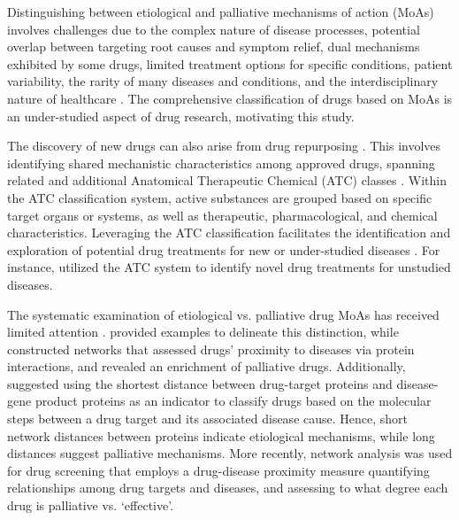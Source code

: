 \documentclass[journal,twoside,web]{ieeecolor}
\begin{document}
Distinguishing between etiological and palliative mechanisms of action (MoAs) involves challenges due to the complex nature of disease processes, potential overlap between targeting root causes and symptom relief, dual mechanisms exhibited by some drugs, limited treatment options for specific conditions, patient variability, the rarity of many diseases and conditions, and the interdisciplinary nature of healthcare \cite{yu2020exploring}.
The comprehensive classification of drugs based on MoAs is an under-studied aspect of drug research, motivating this study.

The discovery of new drugs can also arise from drug repurposing \cite{parvathaneni2019drug}.
This involves identifying shared mechanistic characteristics among approved drugs, spanning related and additional Anatomical Therapeutic Chemical (ATC) classes \cite{xue2018review}.
Within the ATC classification system, active substances are grouped based on specific target organs or systems, as well as therapeutic, pharmacological, and chemical characteristics.
Leveraging the ATC classification facilitates the identification and exploration of potential drug treatments for new or under-studied diseases \cite{yang2017literature}.
For instance, \cite{olson2017predicting} utilized the ATC system to identify novel drug treatments for unstudied diseases.

The systematic examination of etiological vs. palliative drug MoAs has received limited attention \cite{yildirim2007drug,lindpaintner2002impact,guney2016network}.
\cite{lindpaintner2002impact} provided examples to delineate this distinction, while \cite{yildirim2007drug} constructed networks that assessed drugs' proximity to diseases via protein interactions, and revealed an enrichment of palliative drugs.
Additionally, \cite{yildirim2007drug} suggested using the shortest distance between drug-target proteins and disease-gene product proteins as an indicator to classify drugs based on the molecular steps between a drug target and its associated disease cause.
Hence, short network distances between proteins indicate etiological mechanisms, while long distances suggest palliative mechanisms. 
More recently, network analysis was used for drug screening \cite{guney2016network} that employs a drug-disease proximity measure quantifying relationships among drug targets and diseases, and assessing to what degree each drug is palliative vs. `effective'. 
\end{document}
